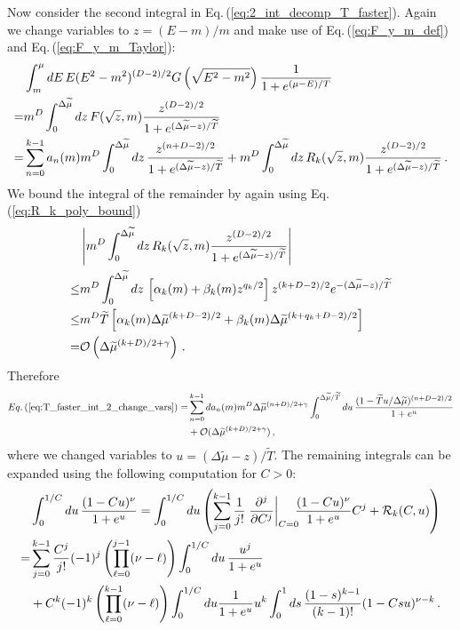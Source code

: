 \documentclass[sn-mathphys,Numbered]{sn-jnl}
\newcommand{\req}[1]{Eq.\,(\ref{#1})}
\begin{document}
Now consider the second integral in \req{eq:2_int_decomp_T_faster}. Again we change variables to $z=(E-m)/m$ and make use of \req{eq:F_y_m_def} and \req{eq:F_y_m_Taylor}:
\begin{align}\label{eq:T_faster_int_2_change_vars} 
 &\int_m^{\mu} dE \,E(E^2-m^2)^{(D-2)/2} G\left(\sqrt{E^2-m^2}\right)\frac{1}{1+e^{(\mu-E)/T}} \\\notag
 =&m^{D}\int_0^{\Delta\widetilde{\mu}} dz \, F(\sqrt{z},m)\frac{z^{(D-2)/2}}{1+e^{(\Delta\widetilde{\mu}-z)/\widetilde{T}}}\notag\\
 =&\sum_{n=0}^{k-1} a_n(m)m^{D}\int_0^{\Delta\widetilde{\mu}} dz \,\frac{z^{(n+D-2)/2}}{1+e^{(\Delta\widetilde{\mu}-z)/\widetilde{T}}} +m^{D}\int_0^{\Delta\widetilde{\mu}} dz \,R_k(\sqrt{z},m)
\frac{z^{(D-2)/2}}{1+e^{(\Delta\widetilde{\mu}-z)/\widetilde{T}}}\notag\,.
\end{align}
We bound the integral of the remainder by again using \req{eq:R_k_poly_bound}
\begin{align}
 &\left|m^{D}\int_0^{\Delta\widetilde{\mu}} dz \,R_k(\sqrt{z},m)
\frac{z^{(D-2)/2}}{1+e^{(\Delta\widetilde{\mu}-z)/\widetilde{T}}}\right|\\
\leq&m^{D}\int_0^{\Delta\widetilde{\mu}} dz \,\left[\alpha_k(m)+\beta_k(m)z^{q_k/2}\right]z^{(k+D-2)/2}e^{-(\Delta\widetilde{\mu}-z)/\widetilde{T}}\notag\\
\leq &m^{D}\widetilde{T}\left[\alpha_k(m)\Delta\widetilde{\mu}^{(k+D-2)/2}+\beta_k(m)\Delta\widetilde{\mu}^{(k+q_k+D-2)/2}\right]\notag\\
=&\mathcal{O}\left(\Delta\widetilde{\mu}^{(k+D)/2+\gamma}\right)\,.\notag
\end{align}
Therefore 
\begin{align} \label{eq:T_faster_int_2_expanded1}
 \req{eq:T_faster_int_2_change_vars} =&\sum_{n=0}^{k-1} da_n(m)m^{D}\Delta\widetilde{\mu}^{(n+D)/2+\gamma}\int^{\Delta\widetilde{\mu}/\widetilde{T}}_{0} du \,\frac{(1-\widetilde{T}u/\Delta\widetilde{\mu})^{(n+D-2)/2}}{1+e^{u}} \\
 &+\mathcal{O}(\Delta\widetilde{\mu}^{(k+D)/2+\gamma})\notag\,,
\end{align}
where we changed variables to $u=(\Delta\widetilde{\mu}-z)/\widetilde{T}$. The remaining integrals can be expanded using the following computation for $C>0$: 
\begin{align}
&\int_0^{1/C} du \,\frac{(1-Cu)^\nu}{1+e^u} = \int_0^{1/C} du\left(\sum_{j=0}^{k-1} \frac{1}{j!} \left. \frac{\partial^j}{\partial C^j}\right|_{C=0}\!\!\!\frac{(1-Cu)^\nu}{1 + e^u} C^j + \mathcal{R}_k(C,u)\right)\\
=&\sum_{j=0}^{k-1}\frac{C^j}{j!}(-1)^j\left(\prod_{\ell=0}^{j-1}(\nu-\ell) \right)\int_0^{1/C} du \,\frac{u^j}{1+e^u} \notag\\
&+ C^k (-1)^k\left(\prod_{\ell=0}^{k-1}(\nu-\ell)\right)\int_0^{1/C} du \frac{1}{1+e^u} u^k\int_0^1ds\,\frac{(1-s)^{k-1}}{(k-1)!} (1-Csu)^{\nu-k}\,.\notag
\end{align}
\end{document}
